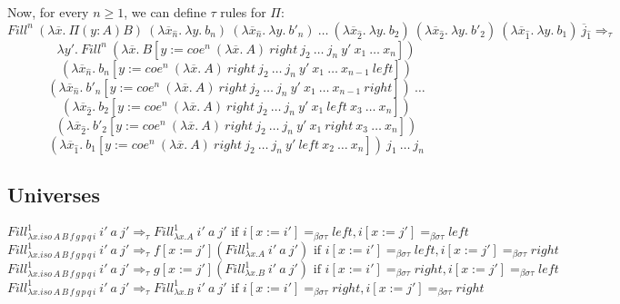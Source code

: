 \documentclass{amsart}
\theoremstyle{definition}
\theoremstyle{remark}
\newcommand{\red}{\Rightarrow}
\newcommand{\bs}{\beta\sigma}
\newcommand{\bst}{\bs\tau}
\newcommand{\ebst}{=_{\bst}}
\numberwithin{figure}{section}
\begin{document}
Now, for every $n \geq 1$, we can define $\tau$ rules for $\Pi$:
\[ Fill^n\ (\lambda \overline{x}.\ \Pi (y : A) B)\ (\lambda \overline{x}_{\hat{n}}.\ \lambda y.\ b_n)\ (\lambda \overline{x}_{\hat{n}}.\ \lambda y.\ b'_n)\ \ldots\ (\lambda \overline{x}_{\hat{2}}.\ \lambda y.\ b_2)\ (\lambda \overline{x}_{\hat{2}}.\ \lambda y.\ b'_2)\ (\lambda \overline{x}_{\hat{1}}.\ \lambda y.\ b_1)\ \overline{j}_{\hat{1}} \red_\tau \]
\[ \lambda y'.\ Fill^n\ (\lambda \overline{x}.\ B[y := coe^n\ (\lambda \overline{x}.\ A)\ right\ j_2\ \ldots\ j_n\ y'\ x_1\ \ldots\ x_n]) \]
\[ (\lambda \overline{x}_{\hat{n}}.\ b_n[y := coe^n\ (\lambda \overline{x}.\ A)\ right\ j_2\ \ldots\ j_n\ y'\ x_1\ \ldots\ x_{n-1}\ left]) \]
\[ (\lambda \overline{x}_{\hat{n}}.\ b'_n[y := coe^n\ (\lambda \overline{x}.\ A)\ right\ j_2\ \ldots\ j_n\ y'\ x_1\ \ldots\ x_{n-1}\ right])\ \ldots \]
\[ (\lambda \overline{x}_{\hat{2}}.\ b_2[y := coe^n\ (\lambda \overline{x}.\ A)\ right\ j_2\ \ldots\ j_n\ y'\ x_1\ left\ x_3\ \ldots\ x_n]) \]
\[ (\lambda \overline{x}_{\hat{2}}.\ b'_2[y := coe^n\ (\lambda \overline{x}.\ A)\ right\ j_2\ \ldots\ j_n\ y'\ x_1\ right\ x_3\ \ldots\ x_n]) \]
\[ (\lambda \overline{x}_{\hat{1}}.\ b_1[y := coe^n\ (\lambda \overline{x}.\ A)\ right\ j_2\ \ldots\ j_n\ y'\ left\ x_2\ \ldots\ x_n])\ j_1\ \ldots\ j_n \]

\subsection{Universes}

\[ Fill^1_{\lambda x. iso\,A\,B\,f\,g\,p\,q\,i}\ i'\ a\ j' \red_\tau Fill^1_{\lambda x. A}\ i'\ a\ j' \text{ if } i[x := i'] \ebst left, i[x := j'] \ebst left \]
\[ Fill^1_{\lambda x. iso\,A\,B\,f\,g\,p\,q\,i}\ i'\ a\ j' \red_\tau f[x := j'] (Fill^1_{\lambda x. A}\ i'\ a\ j') \text{ if } i[x := i'] \ebst left, i[x := j'] \ebst right \]
\[ Fill^1_{\lambda x. iso\,A\,B\,f\,g\,p\,q\,i}\ i'\ a\ j' \red_\tau g[x := j'] (Fill^1_{\lambda x. B}\ i'\ a\ j') \text{ if } i[x := i'] \ebst right, i[x := j'] \ebst left \]
\[ Fill^1_{\lambda x. iso\,A\,B\,f\,g\,p\,q\,i}\ i'\ a\ j' \red_\tau Fill^1_{\lambda x. B}\ i'\ a\ j' \text{ if } i[x := i'] \ebst right, i[x := j'] \ebst right \]
\end{document}
